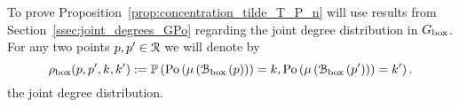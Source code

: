 %

To prove Proposition~\ref{prop:concentration_tilde_T_P_n} will use results from Section~\ref{ssec:joint_degrees_GPo} regarding the joint degree distribution in $G_{\mathrm{box}}$. For any two points $p,p^\prime \in {\mathcal R}$ we will denote by 
\begin{equation}\label{eq:def_joint_degree_distribution_2}
	\rho_{\text{box}}(p,p^\prime,k,k^\prime) 
	:= \mathbb{P}\left({\mathrm{Po}}\left(\mu\left({\mathcal B}_{\text{box}}\left(p\right)\right)\right) = k, {\mathrm{Po}}\left(\mu\left({\mathcal B}_{\text{box}}\left(p^\prime\right)\right)\right) = k^\prime\right).
\end{equation}
the joint degree distribution.

